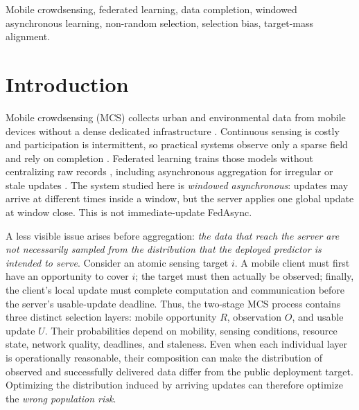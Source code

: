 \documentclass[letterpaper,journal]{IEEEtran}
\begin{document}
\begin{IEEEkeywords}
Mobile crowdsensing, federated learning, data completion, windowed asynchronous learning, non-random selection, selection bias, target-mass alignment.
\end{IEEEkeywords}


\section{Introduction}
\label{sec:introduction}

Mobile crowdsensing (MCS) collects urban and environmental data from mobile
devices without a dense dedicated infrastructure
\cite{ganti2011mobile,guo2015mobile,ma2014opportunities}.
Continuous sensing is costly and participation is intermittent, so practical
systems observe only a sparse field and rely on completion
\cite{wang2023outlier,li2024robust,wang2023transformer,wang2024fewshot,wang2025evolutionary,xu2025rethinking,liu2026pyramid,zhang2026mapt}.
Federated learning trains those models without centralizing raw records
\cite{mcmahan2017communication,yang2019federated,kairouz2021advances,li2020federated},
including asynchronous aggregation for irregular or stale updates
\cite{wang2026federated,xie2019asynchronous,liu2023adaptive,sun2024staleness}.
The system studied here is \emph{windowed asynchronous}: updates may arrive at
different times inside a window, but the server applies one global update at
window close.  This is not immediate-update FedAsync.

A less visible issue arises before aggregation: \emph{the data that reach the
server are not necessarily sampled from the distribution that the deployed
predictor is intended to serve}.  Consider an atomic sensing target $i$.  A
mobile client must first have an opportunity to cover $i$; the target must then
actually be observed; finally, the client's local update must complete
computation and communication before the server's usable-update deadline.
Thus, the two-stage MCS process contains three distinct selection layers:
mobile opportunity $R$, observation $O$, and usable update $U$.  Their
probabilities depend on mobility, sensing conditions, resource state, network
quality, deadlines, and staleness.  Even when each individual layer is
operationally reasonable, their composition can make the distribution of
observed and successfully delivered data differ from the public deployment
target.  Optimizing the distribution induced by arriving updates can therefore
optimize the \emph{wrong population risk}.
\end{document}
